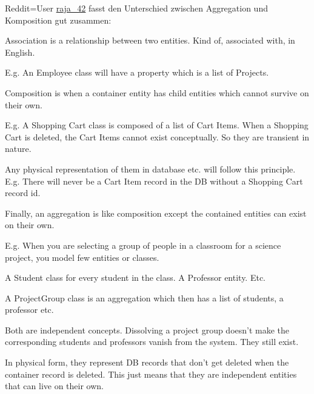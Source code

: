 \documentclass{abgabe}
\begin{document}
\begin{questions}
\begin{solution}
        Reddit=User \href{https://www.reddit.com/r/javahelp/comments/gpnqij/comment/frnuudx/?utm_source=share&utm_medium=web2x&context=3}{raja\_42} fasst den Unterschied zwischen Aggregation und Komposition gut zusammen:
        \begin{displayquote}
            Association is a relationship between two entities. Kind of, associated with, in English.

E.g. An Employee class will have a property which is a list of Projects.

Composition is when a container entity has child entities which cannot survive on their own.

E.g. A Shopping Cart class is composed of a list of Cart Items. When a Shopping Cart is deleted, the Cart Items cannot exist conceptually. So they are transient in nature.

Any physical representation of them in database etc. will follow this principle. E.g. There will never be a Cart Item record in the DB without a Shopping Cart record id.

Finally, an aggregation is like composition except the contained entities can exist on their own.

E.g. When you are selecting a group of people in a classroom for a science project, you model few entities or classes.

A Student class for every student in the class. A Professor entity. Etc.

A ProjectGroup class is an aggregation which then has a list of students, a professor etc.

Both are independent concepts. Dissolving a project group doesn't make the corresponding students and professors vanish from the system. They still exist.

In physical form, they represent DB records that don't get deleted when the container record is deleted. This just means that they are independent entities that can live on their own.
        \end{displayquote}
    \end{solution}
\end{questions}
\end{document}
